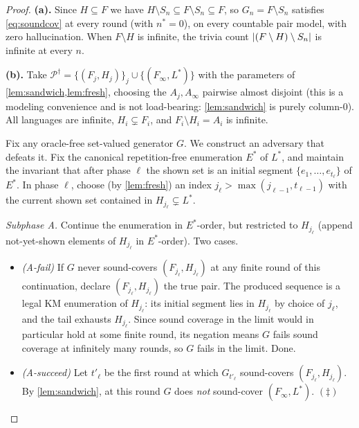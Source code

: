 \documentclass[11pt]{article}
\numberwithin{equation}{section}
\newcommand{\mc}[1]{\mathcal{#1}}
\DeclarePairedDelimiter{\abs}{\lvert}{\rvert}
\newcommand{\Amb}{F}
\newcommand{\Val}{H}
\newcommand{\Pairs}{\mc{P}}
\newcommand{\Seen}{S}
\theoremstyle{plain}
\theoremstyle{definition}
\theoremstyle{remark}
\begin{document}
\begin{proof}
\medskip\noindent\textbf{(a).}\quad
Since $\Val \subseteq \Amb$ we have $\Val \setminus \Seen_n \subseteq \Amb \setminus \Seen_n
\subseteq \Amb$, so $G_n = \Amb \setminus \Seen_n$ satisfies \eqref{eq:soundcov} at every
round (with $n^* = 0$), on every countable pair model, with zero hallucination. When $\Amb
\setminus \Val$ is infinite, the trivia count $\abs{(\Amb \setminus \Val) \setminus \Seen_n}$
is infinite at every $n$.

\medskip\noindent\textbf{(b).}\quad
Take $\Pairs^{\dagger} = \{(\Amb_j, \Val_j)\}_j \cup \{(\Amb_\infty, L^*)\}$ with the
parameters of \cref{lem:sandwich,lem:fresh}, choosing the $A_j, A_\infty$ pairwise almost
disjoint (this is a modeling convenience and is not load-bearing: \cref{lem:sandwich} is
purely column-$0$). All languages are infinite, $\Val_i \subsetneq \Amb_i$, and $\Amb_i
\setminus \Val_i = A_i$ is infinite.

Fix any oracle-free set-valued generator $G$. We construct an adversary that defeats it. Fix
the canonical repetition-free enumeration $E^*$ of $L^*$, and maintain the invariant that
after phase $\ell$ the shown set is an initial segment $\{e_1, \dots, e_{t_\ell}\}$ of $E^*$.
In phase $\ell$, choose (by \cref{lem:fresh}) an index $j_\ell > \max(j_{\ell-1}, t_{\ell-1})$
with the current shown set contained in $\Val_{j_\ell} \subsetneq L^*$.

\emph{Subphase A.} Continue the enumeration in $E^*$-order, but restricted to $\Val_{j_\ell}$
(append not-yet-shown elements of $\Val_{j_\ell}$ in $E^*$-order). Two cases.
\begin{itemize}
  \item \emph{(A-fail)} If $G$ never sound-covers $(\Amb_{j_\ell}, \Val_{j_\ell})$ at any
    finite round of this continuation, declare $(\Amb_{j_\ell}, \Val_{j_\ell})$ the true pair.
    The produced sequence is a legal KM enumeration of $\Val_{j_\ell}$: its initial segment
    lies in $\Val_{j_\ell}$ by choice of $j_\ell$, and the tail exhausts $\Val_{j_\ell}$.
    Since sound coverage in the limit would in particular hold at some finite round, its
    negation means $G$ fails sound coverage at infinitely many rounds, so $G$ fails in the
    limit. Done.
  \item \emph{(A-succeed)} Let $t'_\ell$ be the first round at which $G_{t'_\ell}$
    sound-covers $(\Amb_{j_\ell}, \Val_{j_\ell})$. By \cref{lem:sandwich}, at this round $G$
    does \emph{not} sound-cover $(\Amb_\infty, L^*)$. \hfill$(\ddagger)$
\end{itemize}


\end{proof}
\end{document}
